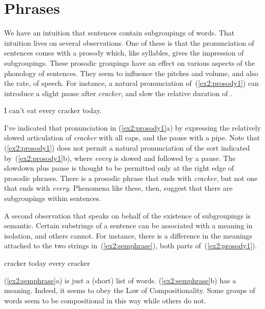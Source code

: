 \section{Phrases}

We have an intuition that sentences contain subgroupings of words. That intuition lives on several observations. One of these is that the pronunciation of sentences comes with a prosody which, like syllables, gives the impression of subgroupings. These prosodic groupings have an effect on various aspects of the phonology of sentences. They seem to influence the pitches and volume, and also the rate, of speech. For instance, a natural pronunciation of~(\ref{ex2:prosody1}) can introduce a slight pause after \emph{cracker}, and slow the relative duration of .
\begin{exe}
	\ex \label{ex2:prosody1} I can't eat every cracker today.
	\begin{xlist}
	\end{xlist}
\end{exe}
I've indicated that pronunciation in (\ref{ex2:prosody1}a) by expressing the relatively slowed articulation of \emph{cracker} with all caps, and the pause with a pipe. Note that (\ref{ex2:prosody1}) does not permit a natural pronunciation of the sort indicated by~(\ref{ex2:prosody1}b), where \emph{every} is slowed and followed by a pause. The slowdown plus pause is thought to be permitted only at the right edge of prosodic phrases. There is a prosodic phrase that ends with \emph{cracker}, but not one that ends with \emph{every}. Phenomena like these, then, suggest that there are subgroupings within sentences.

A second observation that speaks on behalf of the existence of subgroupings is semantic. Certain substrings of a sentence can be associated with a meaning in isolation, and others cannot. For instance, there is a difference in the meanings attached to the two strings in~(\ref{ex2:semphrase}), both parts of~(\ref{ex2:prosody1}).
\begin{exe}
	\ex \label{ex2:semphrase} 
	\begin{xlist}
		\ex cracker today
		\ex every cracker
	\end{xlist}
\end{exe}
(\ref{ex2:semphrase}a) is just a (short) list of words. (\ref{ex2:semphrase}b) has a meaning. Indeed, it seems to obey the Law of Compositionality. Some groups of words seem to be compositional in this way while others do not.

